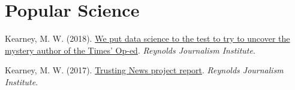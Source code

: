 \section{Popular Science}
\begin{bibenum}
\item Kearney, M. W. (2018). \href{https://www.rjionline.org/stories/we-put-data-science-to-the-test-to-try-to-uncover-the-mystery-author-of-the}{We put data science to the test to try to uncover the mystery author of the Times’ Op-ed}.
\textit{Reynolds Journalism Institute}.
\item Kearney, M. W. (2017). \href{https://www.rjionline.org/reporthtml.html}{Trusting {N}ews project report}.
\textit{Reynolds Journalism Institute}.
\end{bibenum}
